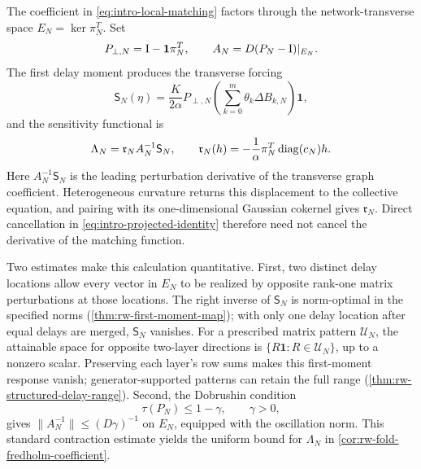 The coefficient in \eqref{eq:intro-local-matching} factors through the
network-transverse space \(E_N=\ker\pi_N^T\).  Set
\[
 P_{\perp,N}=\mathrm I-\mathbf1\pi_N^T,
 \qquad A_N=D(P_N-\mathrm I)|_{E_N}.
\]
The first delay moment produces the transverse forcing
\begin{equation}
 \mathsf S_N(\eta)
 =\frac{K}{2\alpha}P_{\perp,N}
   \left(\sum_{k=0}^m\theta_k\Delta B_{k,N}\right)\mathbf1,
                                                        \label{eq:intro-delay-moment}
\end{equation}
and the sensitivity functional is
\begin{equation}
 \Lambda_N=\mathfrak r_NA_N^{-1}\mathsf S_N,
 \qquad
 \mathfrak r_N(h)=-\frac1\alpha\pi_N^T\operatorname{diag}(c_N)h.
                                                        \label{eq:intro-response-covector}
\end{equation}
Here \(A_N^{-1}\mathsf S_N\) is the leading perturbation derivative of the
transverse graph coefficient.  Heterogeneous curvature returns this displacement to the
collective equation, and pairing with its one-dimensional Gaussian cokernel
gives \(\mathfrak r_N\).  Direct cancellation in
\eqref{eq:intro-projected-identity} therefore need not cancel the derivative
of the matching function.

Two estimates make this calculation quantitative.  First, two distinct delay
locations allow every vector in \(E_N\) to be realized by opposite rank-one
matrix perturbations at those locations.  The right inverse of
\(\mathsf S_N\) is norm-optimal in the specified norms
(\cref{thm:rw-first-moment-map}); with only one delay location after equal
delays are merged, \(\mathsf S_N\) vanishes.  For a prescribed matrix
pattern \(\mathcal U_N\), the attainable space for opposite two-layer
directions is \(\{R\mathbf1:R\in\mathcal U_N\}\), up to a nonzero scalar.
Preserving each layer's row sums makes this first-moment response vanish;
generator-supported patterns can retain the full range
(\cref{thm:rw-structured-delay-range}).  Second, the Dobrushin condition
\begin{equation}
 \tau(P_N)\le1-\gamma,\qquad\gamma>0,                \label{eq:intro-dobrushin-gap}
\end{equation}
gives \(\|A_N^{-1}\|\le(D\gamma)^{-1}\) on \(E_N\), equipped with the
oscillation norm.  This standard contraction estimate
\citep{gaubert2015dobrushin} yields the uniform bound for \(\Lambda_N\) in
\cref{cor:rw-fold-fredholm-coefficient}.

